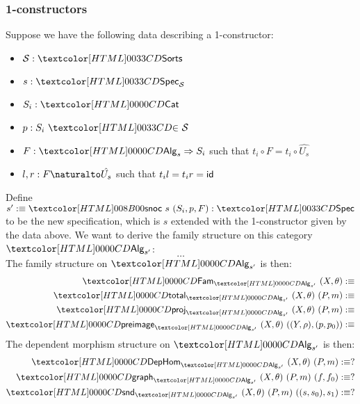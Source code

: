 \subsubsection{1-constructors}

Suppose we have the following data describing a 1-constructor:
%
\begin{itemize}
\item $\Ss : \sortsty$
\item $s : \specty_{\Ss}$
\item $S_i : \Cat$
\item $p : \sortsin{S_i}{\Ss}$
\item $F : \Func{\Alg_s}{S_i}$ such that $t_i \circ F = t_i \circ \hat{U_s}$
\item $l , r : \Nat{F}{\hat{U_s}}$ such that $t_i l = t_i r = \mathsf{id}$
\end{itemize}

Define $s' \ddefeq \specsnoc\ s\ (S_i,p,F) : \specty$ to be the new
specification, which is $s$ extended with the 1-constructor given by
the data above. We want to derive the family structure on this
category $\Alg_{s'}$:
$$
\hdots
$$
The family structure on $\Alg_{s'}$ is then:
%
\begin{align*}
  \Fam_{\Alg_{s'}}\ (X , \theta) &\ddefeq \\
  \total_{\Alg_{s'}}\ (X , \theta)\ (P , m) &\ddefeq \\
  \proj_{\Alg_{s'}}\ (X , \theta)\ (P , m) &\ddefeq \\
  \preimage_{\Alg_{s'}}\ (X,  \theta)\ ((Y , \rho),(p , p_0)) &\ddefeq  
\end{align*}
%
The dependent morphism structure on $\Alg_{s'}$ is then:
%
\begin{align*}
  \DepHom_{\Alg_{s'}}\ (X , \theta)\ (P , m) &\ddefeq ?\\
  \grph_{\Alg_{s'}}\ (X , \theta)\ (P , m)\ (f , f_0) &\ddefeq ? \\
  \snd_{\Alg_{s'}}\ (X , \theta)\ (P , m)\ ((s , s_0) , s_1) &\ddefeq ?
\end{align*}
%

